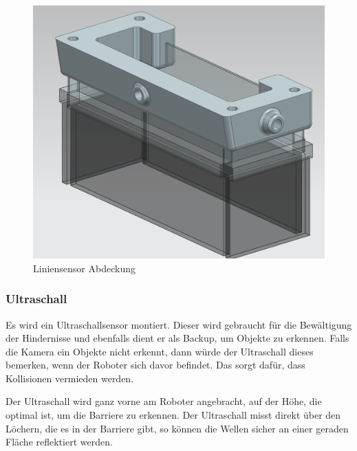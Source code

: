 \begin{figure}[H]
    \centering
    \includegraphics[width=0.75\linewidth]{assets//MT/Sensor Abdeckung.png}
    \caption{Liniensensor Abdeckung}
    \label{fig:Liniensensor Abdeckung}
\end{figure}
\newpage

\subsubsection{Ultraschall}

Es wird ein Ultraschallsensor montiert. Dieser wird gebraucht für die Bewältigung der Hindernisse und ebenfalls dient er als Backup, um Objekte zu erkennen. Falls die Kamera ein Objekte nicht erkennt, dann würde der Ultraschall dieses bemerken, wenn der Roboter sich davor befindet. Das sorgt dafür, dass Kollisionen vermieden werden.

Der Ultraschall wird ganz vorne am Roboter angebracht, auf der Höhe, die optimal ist, um die Barriere zu erkennen. Der Ultraschall misst direkt über den Löchern, die es in der Barriere gibt, so können die Wellen sicher an einer geraden Fläche reflektiert werden.

